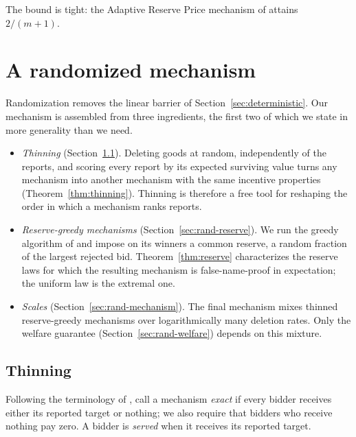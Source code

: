 \documentclass[format=acmsmall, review=false]{acmart}
\begin{document}
The bound is tight: the Adaptive Reserve Price mechanism of
\cite{iwasaki2010worst} attains $2/(m+1)$.

\section{A randomized mechanism}
\label{sec:randomized}

Randomization removes the linear barrier of
Section~\ref{sec:deterministic}. Our mechanism is assembled from
three ingredients, the first two of which we state in more
generality than we need.

\begin{itemize}
\item \emph{Thinning} (Section~\ref{sec:rand-thinning}). Deleting
goods at random, independently of the reports, and scoring every
report by its expected surviving value turns any mechanism into
another mechanism with the same incentive properties
(Theorem~\ref{thm:thinning}). Thinning is therefore a free tool
for reshaping the order in which a mechanism ranks reports.
\item \emph{Reserve-greedy mechanisms}
(Section~\ref{sec:rand-reserve}). We run the greedy algorithm of
\citet{lehmann2002truth} and impose on its winners a common
reserve, a random fraction of the largest rejected bid.
Theorem~\ref{thm:reserve} characterizes the reserve laws for
which the resulting mechanism is false-name-proof in expectation;
the uniform law is the extremal one.
\item \emph{Scales} (Section~\ref{sec:rand-mechanism}). The final
mechanism mixes thinned reserve-greedy mechanisms over
logarithmically many deletion rates. Only the welfare guarantee
(Section~\ref{sec:rand-welfare}) depends on this mixture.
\end{itemize}

\subsection{Thinning}
\label{sec:rand-thinning}

Following the terminology of \citet{lehmann2002truth}, call a
mechanism \emph{exact} if every bidder receives either its
reported target or nothing; we also require that bidders who
receive nothing pay zero. A bidder is \emph{served} when it
receives its reported target.
\end{document}
